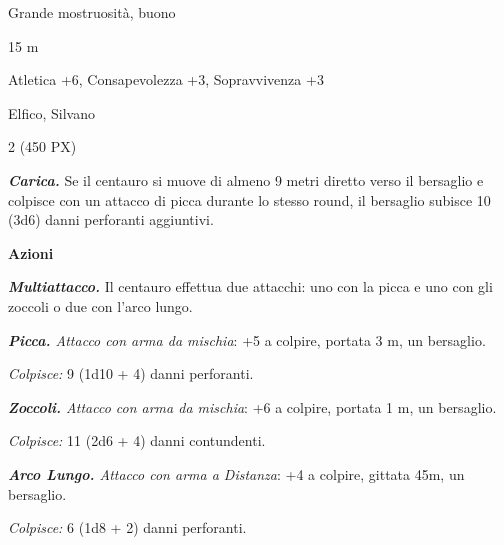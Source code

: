 \begin{multicols}{2}
{
\begin{description}[noitemsep, topsep=0pt, parsep=0pt, partopsep=0pt, itemsep=1pt, leftmargin=2.35cm,  labelwidth=2.2cm, itemindent=0cm, listparindent=0pt] %
\setlength{\baselineskip}{10pt}
\item[\textbf{Taglia/Tipo}] Grande mostruosità, buono
\item[\textbf{Caratt.}] 
\item[\textbf{Punti Ferita}] 
\item[\textbf{Movimento}] 15 m
\item[\textbf{Tiri Salvez.}] 
\item[\textbf{Comp.}] Atletica +6, Consapevolezza +3, Sopravvivenza +3
\item[\textbf{Linguaggi}] Elfico, Silvano
\item[\textbf{Sfida}] 2 (450 PX)
\end{description}
\smallskip

\emph{\textbf{Carica.}} Se il centauro si muove di almeno 9 metri diretto verso il bersaglio e colpisce con un attacco di picca durante lo stesso round, il bersaglio subisce 10 (3d6) danni perforanti aggiuntivi.

\textbf{Azioni}

\emph{\textbf{Multiattacco.}} Il centauro effettua due attacchi: uno con la picca e uno con gli zoccoli o due con l'arco lungo.

\emph{\textbf{Picca.} Attacco con arma da mischia}: +5 a colpire, portata 3 m, un bersaglio.

\emph{Colpisce:} 9 (1d10 + 4) danni perforanti.

\emph{\textbf{Zoccoli.} Attacco con arma da mischia}: +6 a colpire, portata 1 m, un bersaglio.

\emph{Colpisce:} 11 (2d6 + 4) danni contundenti.

\emph{\textbf{Arco Lungo.} Attacco con arma a Distanza}: +4 a colpire, gittata 45m, un bersaglio.

\emph{Colpisce:} 6 (1d8 + 2) danni perforanti.

}
\end{multicols}
